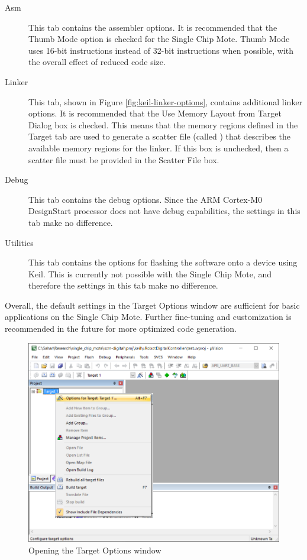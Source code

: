 \begin{description}
	\item[Asm] This tab contains the assembler options. It is recommended that the Thumb Mode option is checked for the Single Chip Mote. Thumb Mode uses 16-bit instructions instead of 32-bit instructions when possible, with the overall effect of reduced code size.
	\item[Linker] This tab, shown in Figure \ref{fig:keil-linker-options}, contains additional linker options. It is recommended that the Use Memory Layout from Target Dialog box is checked. This means that the memory regions defined in the Target tab are used to generate a scatter file (called ) that describes the available memory regions for the linker. If this box is unchecked, then a scatter file must be provided in the Scatter File box.
	\item[Debug] This tab contains the debug options. Since the ARM Cortex-M0 DesignStart processor does not have debug capabilities, the settings in this tab make no difference.
	\item[Utilities] This tab contains the options for flashing the software onto a device using Keil. This is currently not possible with the Single Chip Mote, and therefore the settings in this tab make no difference.
\end{description}

Overall, the default settings in the Target Options window are sufficient for basic applications on the Single Chip Mote. Further fine-tuning and customization is recommended in the future for more optimized code generation.

\begin{figure}
\centering
\includegraphics[width=1\linewidth]{images/keil-options-for-target}
\caption{Opening the Target Options window}
\label{fig:keil-options-for-target}
\end{figure}

